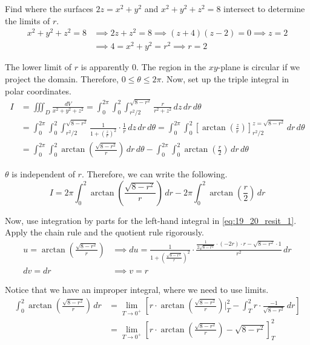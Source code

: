 \documentclass[a4paper, 12pt]{article}
\begin{document}
\begin{enumerate}[leftmargin=*,label=\textbf{\arabic*.}]
Find where the surfaces $2z=x^2+y^2$ and $x^2+y^2+z^2=8$ intersect to determine the limits of $r$.
\begin{align*}x^2+y^2+z^2=8&\implies 2z + z^2 = 8\implies (z+4)(z-2) = 0\implies z=2\\&\implies4=x^2+y^2=r^2 \implies r=2\end{align*}

The lower limit of $r$ is apparently $0$. The region in the $xy$-plane is circular if we project the domain. Therefore, $0\leq\theta\leq2\pi$. Now, set up the triple integral in polar coordinates.
\begin{align*}I&=\iiint_D\frac{dV}{x^2+y^2+z^2}=\int_0^{2\pi}\int_0^2\int_{r^2/2}^{\sqrt{8-r^2}}\frac{r}{r^2+z^2}\,dz\,dr\,d\theta\\[1em]&=\int_0^{2\pi}\int_0^2\int_{r^2/2}^{\sqrt{8-r^2}}\frac{1}{1+\left(\frac zr\right)^2}\cdot\frac1r\,dz\,dr\,d\theta=\int_0^{2\pi}\int_0^2\left[\arctan\left(\frac zr\right)\right]_{r^2/2}^{z=\sqrt{8-r^2}}\,dr\,d\theta\\[1em]&=\int_0^{2\pi}\int_0^2\arctan\left(\frac{\sqrt{8-r^2}}r\right)\,dr\,d\theta-\int_0^{2\pi}\int_0^2\arctan\left(\frac r2\right)\,dr\,d\theta\end{align*}

$\theta$ is independent of $r$. Therefore, we can write the following.
\begin{equation}
I=2\pi\int_0^2\arctan\left(\frac{\sqrt{8-r^2}}r\right)\,dr-2\pi\int_0^2\arctan\left(\frac r2\right)\,dr
\label{eq:19_20_resit_1}
\end{equation}

Now, use integration by parts for the left-hand integral in \eqref{eq:19_20_resit_1}. Apply the chain rule and the quotient rule rigorously.
\begin{align*}
\displaystyle u=\arctan\left(\frac{\sqrt{8-r^2}}r\right)&\implies\displaystyle du=\frac1{1+\left(\frac{\sqrt{8-r^2}}r\right)^2}\cdot\frac{\frac{1}{2\sqrt{8-r^2}}\cdot(-2r)\cdot r -\sqrt{8-r^2}\cdot 1}{r^2}\,dr\\
\displaystyle dv=dr&\implies v=r
\end{align*}

Notice that we have an improper integral, where we need to use limits.
\begin{align}
\int_0^2\arctan\left(\frac{\sqrt{8-r^2}}r\right)\,dr&=\lim_{T\to0^+}\left[r\cdot\arctan\left(\frac{\sqrt{8-r^2}}r\right)\Bigg|_T^2-\int_T^2r\cdot\frac{-1}{\sqrt{8-r^2}}\,dr\right]\nonumber\\[1em]&=\lim_{T\to0^+}\left[r\cdot\arctan\left(\frac{\sqrt{8-r^2}}r\right)-\sqrt{8-r^2}\right]_T^2
\label{eq:19_20_resit_2}
\end{align}


\end{enumerate}
\end{document}
